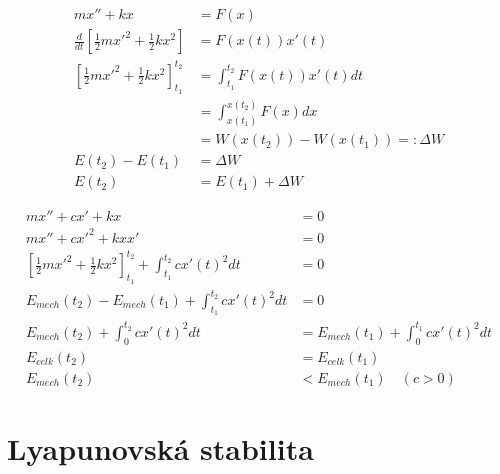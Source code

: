 \begin{příklad}
\begin{align*}
	mx''+kx &= F(x) \\
	\frac{d}{dt}\left[\frac{1}{2}mx'^2+\frac{1}{2}kx^{2}\right] &= F(x(t))x'(t) \\
	\left[\frac{1}{2}mx'^2+\frac{1}{2}kx^{2}\right]_{t_1}^{t_2} &= \int_{t_1}^{t_2}F(x(t))x'(t)dt \\
								    &= \int_{x(t_1)}^{x(t_2)}F(x)dx \\
								    &= W(x(t_2))-W(x(t_1))=:\Delta W \\
	E(t_2)-E(t_1)&= \Delta W \\
	E(t_2)&= E(t_1)+\Delta W
\end{align*}
\end{příklad}

\begin{příklad}
\begin{align*}
	mx''+cx'+kx &= 0 \\
	mx''+cx'^2+kxx' &= 0 \\
	\left[\frac{1}{2}mx'^2+\frac{1}{2}kx^{2}\right]_{t_1}^{t_2}+\int_{t_1}^{t_2} cx'(t)^2 dt &= 0 \\
	E_{mech}(t_2)-E_{mech}(t_1)+\int_{t_1}^{t_2}cx'(t)^2dt &= 0 \\
	E_{mech}(t_2)+\int_{0}^{t_2}cx'(t)^{2}dt&=E_{mech}(t_1)+\int_{0}^{t_1}cx'(t)^{2}dt\\
	E_{celk}(t_2)&=E_{celk}(t_1) \\
	E_{mech}(t_2)&<E_{mech}(t_1) \quad (c>0)
\end{align*}
\end{příklad}

\section{Lyapunovská stabilita}
